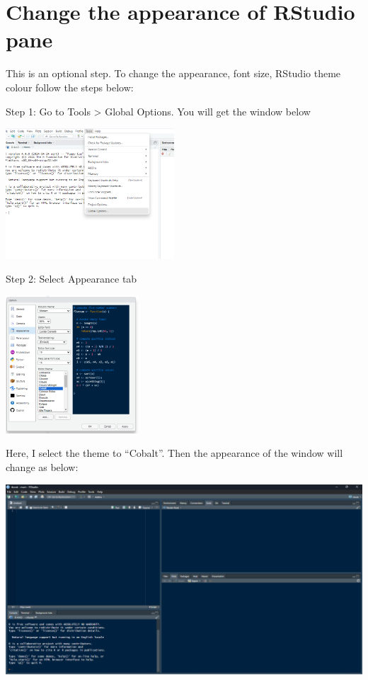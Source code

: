\documentclass[
  letterpaper,
  DIV=11,
  numbers=noendperiod]{scrreprt}
\begin{document}
\section{Change the appearance of RStudio
pane}\label{change-the-appearance-of-rstudio-pane}

This is an optional step. To change the appearance, font size, RStudio
theme colour follow the steps below:

Step 1: Go to Tools \textgreater{} Global Options. You will get the
window below

\includegraphics[width=2.48in,height=\textheight,keepaspectratio]{img/chap1/rw6.png}

Step 2: Select Appearance tab

\includegraphics[width=1.96in,height=\textheight,keepaspectratio]{img/chap1/rw7.png}

Here, I select the theme to ``Cobalt''. Then the appearance of the
window will change as below:

\includegraphics[width=5.33in,height=\textheight,keepaspectratio]{img/chap1/rw12.png}
\end{document}
